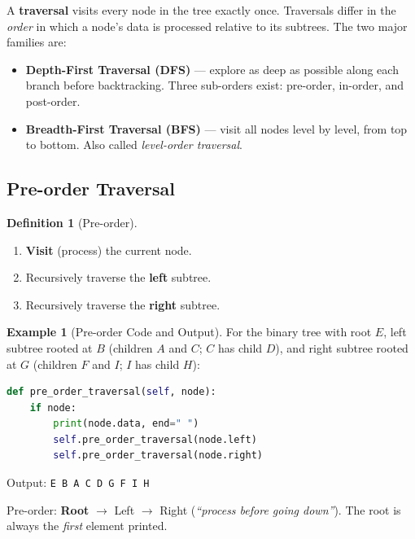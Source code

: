 \documentclass[11pt, a4paper, notitlepage]{report}
\theoremstyle{definition}
\newtheorem{definition}[theorem]{Definition}
\theoremstyle{remark}
\theoremstyle{definition}
\newtheorem{example}[theorem]{Example}
\begin{document}
A \textbf{traversal} visits every node in the tree exactly once.  Traversals
differ in the \emph{order} in which a node's data is processed relative to its
subtrees.  The two major families are:

\begin{itemize}
  \item \textbf{Depth-First Traversal (DFS)} --- explore as deep as possible
        along each branch before backtracking.  Three sub-orders exist:
        pre-order, in-order, and post-order.
  \item \textbf{Breadth-First Traversal (BFS)} --- visit all nodes level by
        level, from top to bottom.  Also called \emph{level-order traversal}.
\end{itemize}

\subsection{Pre-order Traversal}
\label{subsec:preorder}

\begin{definition}[Pre-order]
\label{def:preorder}
\begin{enumerate}
  \item \textbf{Visit} (process) the current node.
  \item Recursively traverse the \textbf{left} subtree.
  \item Recursively traverse the \textbf{right} subtree.
\end{enumerate}
\end{definition}

\begin{example}[Pre-order Code and Output]
\label{ex:preorder}
For the binary tree with root $E$, left subtree rooted at $B$ (children $A$
and $C$; $C$ has child $D$), and right subtree rooted at $G$ (children $F$
and $I$; $I$ has child $H$):

\begin{lstlisting}[language=Python]
def pre_order_traversal(self, node):
    if node:
        print(node.data, end=" ")
        self.pre_order_traversal(node.left)
        self.pre_order_traversal(node.right)
\end{lstlisting}

Output: \texttt{E B A C D G F I H}
\end{example}

\begin{keyresult}[title={Key Result: Pre-order Mnemonic}]
Pre-order: \textbf{Root} $\to$ Left $\to$ Right \quad (\emph{``process before
going down''}).  The root is always the \emph{first} element printed.
\end{keyresult}
\end{document}
